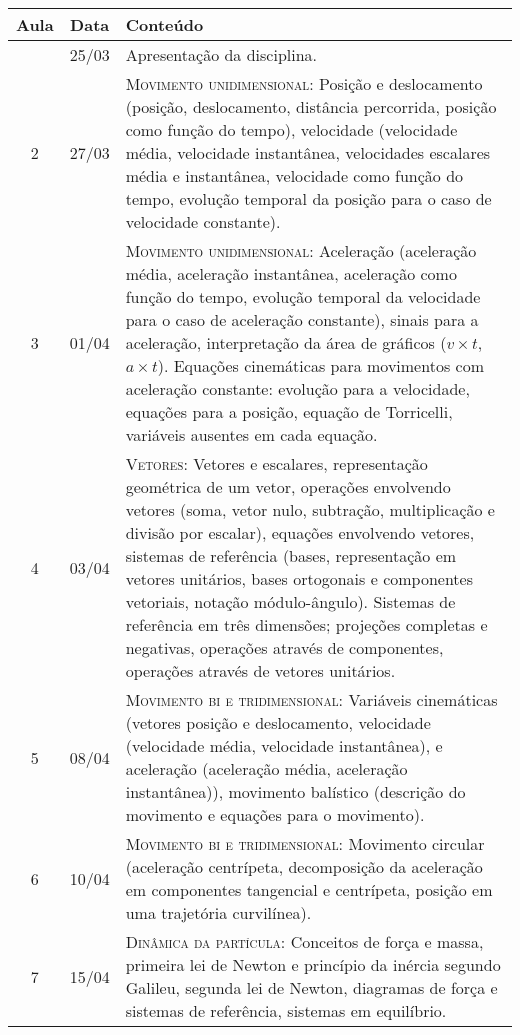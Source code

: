 \begin{center}
\begin{longtable}{ccp{70mm}}
\toprule
Aula & Data & Conteúdo \\
\midrule
\endhead
\bottomrule
\endfoot
1	 & 	25/03	 & 	Apresentação da disciplina. \\
2	 & 	27/03	 & 	\textsc{Movimento unidimensional:} Posição e deslocamento (posição, deslocamento, distância percorrida, posição como função do tempo), velocidade (velocidade média, velocidade instantânea, velocidades escalares média e instantânea, velocidade como função do tempo, evolução temporal da posição para o caso de velocidade constante). \\
3	 & 	01/04	 & 	\textsc{Movimento unidimensional:} Aceleração (aceleração média, aceleração instantânea, aceleração como função do tempo, evolução temporal da velocidade para o caso de aceleração constante), sinais para a aceleração, interpretação da área de gráficos ($v \times t$, $a \times  t$). Equações cinemáticas para movimentos com aceleração constante: evolução para a velocidade, equações para a posição, equação de Torricelli, variáveis ausentes em cada equação. \\
4	 & 	03/04	 & 	\textsc{Vetores:} Vetores e escalares, representação geométrica de um vetor, operações envolvendo vetores (soma, vetor nulo, subtração, multiplicação e divisão por escalar), equações envolvendo vetores, sistemas de referência (bases, representação em vetores unitários, bases ortogonais e componentes vetoriais, notação módulo-ângulo). Sistemas de referência em três dimensões; projeções completas e negativas, operações através de componentes, operações através de vetores unitários. \\
5	 & 	08/04	 &  	\textsc{Movimento bi e tridimensional:} Variáveis cinemáticas (vetores posição e deslocamento, velocidade (velocidade média, velocidade instantânea), e aceleração (aceleração média, aceleração instantânea)), movimento balístico (descrição do movimento e equações para o movimento). \\
6	 & 	10/04	 & 	\textsc{Movimento bi e tridimensional:} Movimento circular (aceleração centrípeta, decomposição da aceleração em componentes tangencial e centrípeta, posição em uma trajetória curvilínea). \\
7	 & 	15/04	 & 	\textsc{Dinâmica da partícula:} Conceitos de força e massa, primeira lei de Newton e princípio da inércia segundo Galileu, segunda lei de Newton, diagramas de força e sistemas de referência, sistemas em equilíbrio. \\

\end{longtable}
\end{center}
